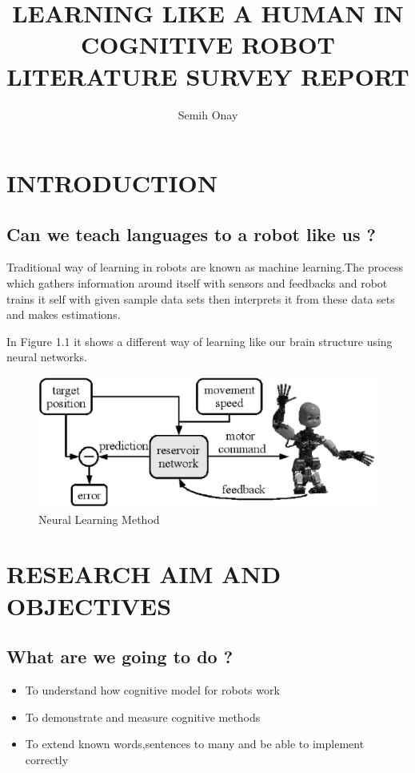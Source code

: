 \documentclass[12pt]{report}
\title{LEARNING LIKE A HUMAN IN COGNITIVE ROBOT \\ LITERATURE SURVEY REPORT}
\author{Semih Onay}
\begin{document}
\makecstitle

\chapter{INTRODUCTION}

\section{Can we teach languages to a robot like us ?}

Traditional way of learning in robots are known as machine learning.The process which gathers information around itself with sensors and feedbacks and robot trains it self with given sample data sets then interprets it from these data sets and makes estimations.

In Figure 1.1 it shows a different way of learning like our brain structure using neural networks.

\begin{figure}[h]
\begin{center}
\includegraphics[scale=0.5]{controller.png}
\caption{Neural Learning Method}
\end{center}
\end{figure}

\chapter{RESEARCH AIM AND OBJECTIVES}
\section{What are we going to do ?}

\begin{itemize}
	\item To understand how cognitive model for robots work
	\item To demonstrate and measure cognitive methods
	\item To extend known words,sentences to many and be able to implement correctly
\end{itemize}
\end{document}
